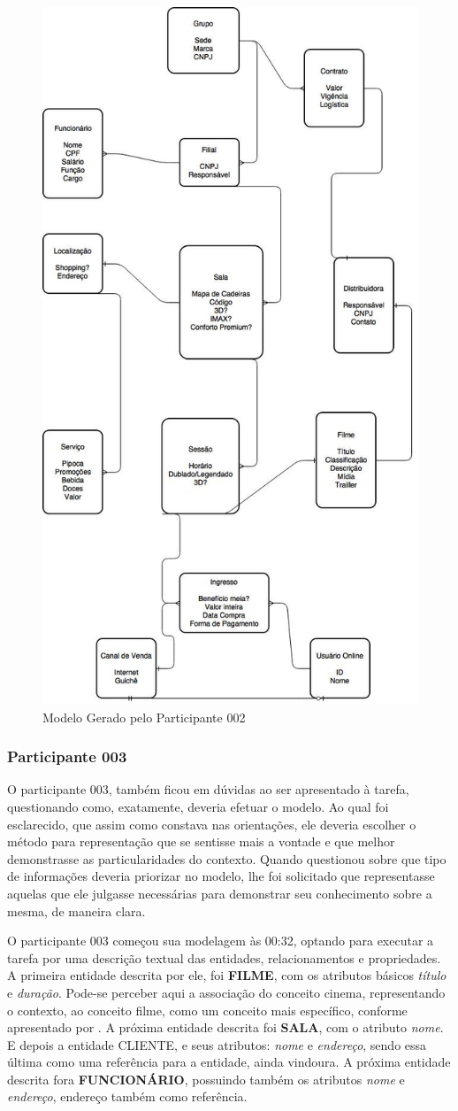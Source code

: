 \begin{figure}[!ht]
    \centering
    \includegraphics[width=\textwidth, height=\textwidth]{imagens/Modelo_000_Igor.jpg}
    \caption{Modelo Gerado pelo Participante 002}
    \label{fig:Modelo_000_igor}
\end{figure}

\subsubsection{\hspace*{3pt} Participante 003}
\label{sec:participante_003}

O participante 003, também ficou em dúvidas ao ser apresentado à tarefa, questionando como, exatamente, deveria efetuar o modelo. Ao qual foi esclarecido, que assim como constava nas orientações, ele deveria escolher o método para representação que se sentisse mais a vontade e que melhor demonstrasse as particularidades do contexto. Quando questionou sobre que tipo de informações deveria priorizar no modelo, lhe foi solicitado que representasse aquelas que ele julgasse necessárias para demonstrar seu conhecimento sobre a mesma, de maneira clara.

O participante 003 começou sua modelagem às 00:32, optando para executar a tarefa por uma descrição textual das entidades, relacionamentos e propriedades. A primeira entidade descrita por ele, foi \textbf{FILME}, com os atributos básicos \textit{título} e \textit{duração}. Pode-se perceber aqui a associação do conceito cinema, representando o contexto, ao conceito filme, como um conceito mais específico, conforme apresentado por \citep{dahlberg:1978.fundamentos}. A próxima entidade descrita foi \textbf{SALA}, com o atributo \textit{nome}. E depois a entidade CLIENTE, e seus atributos: \textit{nome} e \textit{endereço}, sendo essa última como uma referência para a entidade, ainda vindoura.  A próxima entidade descrita fora \textbf{FUNCIONÁRIO}, possuindo também os atributos \textit{nome} e \textit{endereço}, endereço também como referência.


